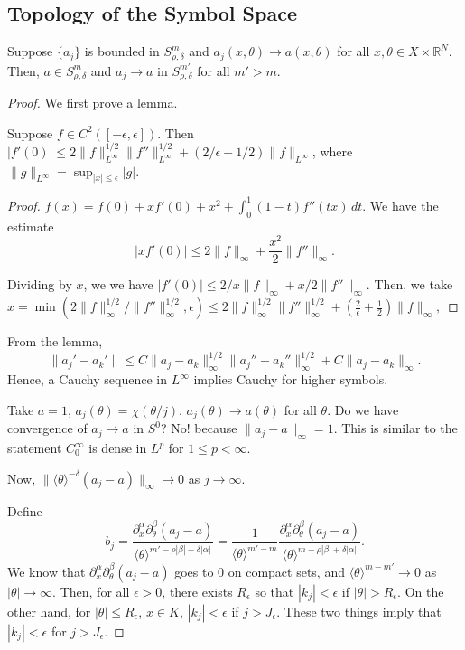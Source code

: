 \documentclass[12pt]{scrartcl}
\newcommand{\R}{\mathbb{R}}
\newcommand{\<}{\langle}
\renewcommand{\>}{\rangle}
\begin{document}
\subsection{Topology of the Symbol Space}
\begin{proposition} Suppose $\{a_j\}$ is bounded in $S_{\rho, \delta}^m$ and $a_j(x, \theta) \to a(x, \theta)$ for all $x, \theta \in X \times \R^N$. Then, $a \in S_{\rho, \delta}^m$ and $a_j \to a$ in $S_{\rho, \delta}^{m'}$ for all $m' > m$.
\end{proposition}
\begin{proof}
We first prove a lemma.  
\begin{lemma} Suppose $f \in C^2([-\epsilon, \epsilon])$.  Then $|f'(0)| \le 2 \|f\|_{L^\infty}^{1/2} \|f''\|_{L^\infty}^{1/2} + (2/\epsilon + 1/2) \|f\|_{L^\infty}$, where $\|g\|_{L^\infty} = \sup_{|x|\le \epsilon} |g|$.
\end{lemma}
\begin{proof}
$f(x) = f(0) + xf'(0) + x^2 + \int_0^1 (1 - t)f''(tx)\,dt$. We have the estimate 
$$|x f'(0)| \le 2\|f\|_\infty + \frac{x^2}{2}\|f''\|_\infty.$$

Dividing by $x$, we we have $|f'(0)| \le 2/x\|f\|_\infty +x/2 \|f''\|_\infty$.  Then, we take $x = \min(2 \|f\|_\infty^{1/2}/\|f''\|_\infty^{1/2}, \epsilon) \le 2\|f\|_\infty^{1/2}\|f''\|_\infty^{1/2} + (\frac{2}{\epsilon} + \frac{1}{2})\|f\|_\infty,$
\end{proof}
From the lemma,
$$\|a_j' - a_k'\| \le C\|a_j - a_k\|_{\infty}^{1/2} \|a_j'' - a_k''\|_{\infty}^{1/2} + C \|a_j - a_k\|_\infty.$$
Hence, a Cauchy sequence in $L^\infty$ implies Cauchy for higher symbols.      

\begin{example} Take $a = 1$, $a_j(\theta) = \chi(\theta/j)$.  $a_j(\theta) \to a(\theta)$ for all $\theta$.  Do we have convergence of $a_j \to a$ in $S^0$?  No! because $\|a_j - a\|_\infty = 1$.  This is similar to the statement $C_0^\infty$ is dense in $L^p$ for $1 \le p < \infty$.

Now, $\|\<\theta\>^{-\delta}(a_j - a)\|_\infty \to 0$ as $j \to \infty$.  
\end{example}
Define $$b_j = \frac{\partial_x^\alpha \partial_\theta^\beta (a_j - a)}{\<\theta\>^{m' - \rho|\beta| + \delta|\alpha|}} = \frac{1}{\<\theta\>^{m' - m}} \frac{\partial_x^\alpha \partial_\theta^\beta(a_j - a)}{\<\theta\>^{m - \rho|\beta| + \delta|\alpha|}}.$$
We know that $\partial_x^\alpha \partial_\theta^\beta(a_j - a)$ goes to $0$ on compact sets, and $\<\theta\>^{m - m'} \to 0$ as $|\theta| \to \infty$.  Then, for all $\epsilon > 0$, there exists $R_\epsilon$ so that $|k_j| < \epsilon$ if $|\theta| > R_\epsilon$.  On the other hand, for $|\theta| \le R_\epsilon$, $x \in K$, $|k_j| < \epsilon$ if $j>J_\epsilon$.    These two things imply that $|k_j| < \epsilon$ for $j > J_\epsilon$.   
\end{proof}
\pagebreak
\end{document}
